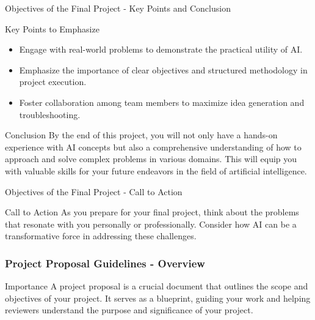 \documentclass[aspectratio=169]{beamer}
\begin{document}
\begin{frame}[fragile]{Objectives of the Final Project - Key Points and Conclusion}
    \begin{block}{Key Points to Emphasize}
        \begin{itemize}
            \item Engage with real-world problems to demonstrate the practical utility of AI.
            \item Emphasize the importance of clear objectives and structured methodology in project execution.
            \item Foster collaboration among team members to maximize idea generation and troubleshooting.
        \end{itemize}
    \end{block}

    \begin{block}{Conclusion}
        By the end of this project, you will not only have a hands-on experience with AI concepts but also a comprehensive understanding of how to approach and solve complex problems in various domains. This will equip you with valuable skills for your future endeavors in the field of artificial intelligence.
    \end{block}
\end{frame}

\begin{frame}[fragile]{Objectives of the Final Project - Call to Action}
    \begin{block}{Call to Action}
        As you prepare for your final project, think about the problems that resonate with you personally or professionally. Consider how AI can be a transformative force in addressing these challenges.
    \end{block}
\end{frame}

\begin{frame}[fragile]
  \frametitle{Project Proposal Guidelines - Overview}
  \begin{block}{Importance}
    A project proposal is a crucial document that outlines the scope and objectives of your project. It serves as a blueprint, guiding your work and helping reviewers understand the purpose and significance of your project.
  \end{block}
\end{frame}
\end{document}
